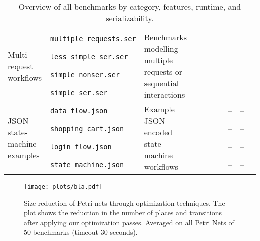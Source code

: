 \begin{table}[ht]
{\begin{tabular}{%
				l   %
				l   %
				p{5cm}   %
				cccc  %
				rr    %
				c     %
			}
			\multirow{4}{*}{Multi-request workflows}
			& \texttt{multiple\_requests.ser}
			& \multirow{4}{5cm}{Benchmarks modelling multiple requests or sequential interactions}
			&  &  &  &  & -- & -- & \cmark \\
			& \texttt{less\_simple\_ser.ser}
			& 
			&  & \cmark &  & \cmark & -- & -- &  \\
			& \texttt{simple\_nonser.ser}
			& 
			&  &  &  &  & -- & -- &  \\
			& \texttt{simple\_ser.ser}
			& 
			&  &  &  & \cmark & -- & -- & \cmark \\
			\midrule
			
			\multirow{4}{*}{JSON state-machine examples}
			& \texttt{data\_flow.json}
			& \multirow{4}{5cm}{Example JSON-encoded state machine workflows}
			&  &  &  &  & -- & -- &  \\
			& \texttt{shopping\_cart.json}
			& 
			&  &  &  &  & -- & -- &  \\
			& \texttt{login\_flow.json}
			& 
			&  &  &  &  & -- & -- &  \\
			& \texttt{state\_machine.json}
			& 
			&  &  &  &  & -- & -- &  \\
			
			\bottomrule
		\end{tabular}%
	}
	\caption{Overview of all benchmarks by category, features, runtime, and serializability.}
	\label{tab:benchmarks}
\end{table}


\begin{figure}[htbp]
	\centering
	\texttt{[image: plots/bla.pdf]}
	\caption{Size reduction of Petri nets through optimization techniques. The plot shows the reduction in the number of places and transitions after applying our optimization passes. Averaged on all Petri Nets of 50 benchmarks (timeout 30 seconds).}
	\label{fig:petri_size_reduction}
\end{figure}


